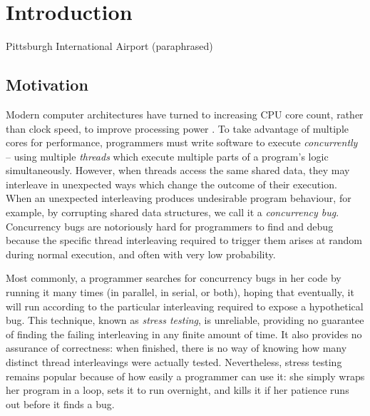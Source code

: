 \chapter{Introduction}
{Pittsburgh International Airport (paraphrased)}

\section{Motivation}


Modern computer architectures have turned to increasing CPU core count, rather than clock speed, to improve processing power \cite{mooreslaw}.
To take advantage of multiple cores for performance, programmers must write software to execute {\em concurrently} --
using multiple {\em threads} which execute multiple parts of a program's logic simultaneously.
However, when threads access the same shared data, they may interleave in unexpected ways which change the outcome of their execution.
When an unexpected interleaving produces undesirable program behaviour,
for example, by corrupting shared data structures,
we call it a {\em concurrency bug}.
Concurrency bugs are notoriously hard for programmers to find and debug
because the specific thread interleaving required to trigger them arises at random during normal execution,
and often with very low probability.

Most commonly, a programmer searches for concurrency bugs in her code by running it many times (in parallel, in serial, or both),
hoping that eventually, it will run according to the particular interleaving required to expose a hypothetical bug.
This technique, known as {\em stress testing}, is unreliable,
providing no guarantee of finding the failing interleaving in any finite amount of time.
It also provides no assurance of correctness:
when finished, there is no way of knowing how many distinct thread interleavings were actually tested.
Nevertheless, stress testing remains popular because of how easily a programmer can use it:
she simply wraps her program in a loop, sets it to run overnight, and kills it if her patience runs out before it finds a bug.

